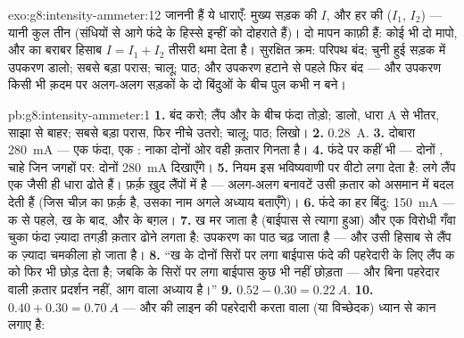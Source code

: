 \begin{solution}{exo:g8:intensity-ammeter:12}
जाननी हैं ये धाराएँ: मुख्य सड़क की $I$, और हर  की ($I_1$, $I_2$)
--- यानी कुल तीन (संधियों से आगे फंदे के हिस्से इन्हीं को दोहराते
हैं)। दो मापन काफ़ी हैं: कोई भी दो मापो, और  का बराबर हिसाब
$I = I_1 + I_2$ तीसरी थमा देता है। सुरक्षित क्रम: परिपथ बंद; चुनी हुई
सड़क में उपकरण डालो; सबसे बड़ा परास; चालू; पाठ; और उपकरण हटाने से पहले
फिर बंद --- और उपकरण किसी भी क़दम पर अलग-अलग सड़कों के दो बिंदुओं के
बीच पुल कभी न बने।
\end{solution}

\begin{solution}{pb:g8:intensity-ammeter:1}
\textbf{1.} बंद करो; लैंप और  के बीच फंदा तोड़ो;  डालो,
धारा \unit{A} से भीतर, साझा से बाहर; सबसे बड़ा परास, फिर नीचे उतरो;
चालू; पाठ;  लिखो।
\textbf{2.} \qty{0.28}{A}.
\textbf{3.} दोबारा \qty{280}{mA} --- एक फंदा, एक : नाका दोनों
ओर वही क़तार गिनता है।
\textbf{4.} फंदे पर कहीं भी --- दोनों , चाहे जिन जगहों पर:
दोनों \qty{280}{mA} दिखाएँगे।
\textbf{5.} नियम इस भविष्यवाणी पर वीटो लगा देता है:  लगे
लैंप एक जैसी ही धारा ढोते हैं। फ़र्क़ ख़ुद लैंपों में है --- अलग-अलग
बनावटें उसी क़तार को असमान  में बदल देती हैं (जिस चीज़ का फ़र्क़
है, उसका नाम अगले अध्याय बताएँगे)।
\textbf{6.} फंदे का हर बिंदु: \qty{150}{mA} --- क से पहले, ख के बाद,
और  के बग़ल।
\textbf{7.} ख मर जाता है (बाईपास से त्यागा हुआ) और एक विरोधी गँवा
चुका फंदा ज़्यादा तगड़ी क़तार ढोने लगता है: उपकरण का पाठ चढ़ जाता है
--- और उसी हिसाब से लैंप क ज़्यादा चमकीला हो जाता है।
\textbf{8.} ``ख के दोनों सिरों पर लगा बाईपास फंदे की पहरेदारी के लिए
लैंप क को फिर भी छोड़ देता है; जबकि  के सिरों पर लगा बाईपास कुछ
भी नहीं छोड़ता --- और बिना पहरेदार वाली क़तार प्रदर्शन नहीं, आग वाला
अध्याय है।''
\textbf{9.} $0.52 - 0.30 = \qty{0.22}{A}$.
\textbf{10.} $0.40 + 0.30 = \qty{0.70}{A}$ --- और  की लाइन की
पहरेदारी करता  वाला  (या विच्छेदक) ध्यान से कान लगाए है:

\end{solution}
